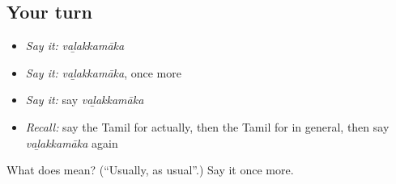 \subsection*{Your turn}
\begin{itemize}
\raggedright
  \item \emph{Say it:} \emph{vaḻakkamāka}
  \item \emph{Say it:} \emph{vaḻakkamāka}, once more
  \item \emph{Say it:} say \emph{vaḻakkamāka}
  \item \emph{Recall:} say the Tamil for actually, then the Tamil for in general, then say \emph{vaḻakkamāka} again
\end{itemize}

\begin{tcolorbox}[breakable,colback=teal!4,colframe=teal!35!black,title={Before you move on}]
What does  mean? (\textquotedblleft{}Usually, as usual\textquotedblright{}.) Say it once more.
\end{tcolorbox}
